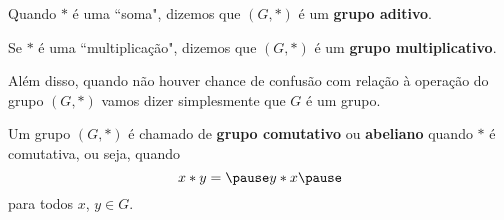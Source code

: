\documentclass{beamer}
\begin{document}
    \begin{frame}
        \begin{observacao}
            Quando $*$ é uma ``soma", \pause dizemos que $(G,*)$ é um \textbf{grupo aditivo}.\pause

            \vspace{.3cm}

            Se $*$ é uma ``multiplicação", \pause dizemos que $(G,*)$ é um \textbf{grupo multiplicativo}.\pause

            \vspace{.3cm}
            Além disso, quando não houver chance de confusão com relação à operação do grupo $(G, \ast )$ \pause vamos dizer simplesmente que $G$ é um grupo.\pause
        \end{observacao}
        \end{frame}

        \begin{frame}
        \begin{definicao}
            Um grupo $(G,*)$ \pause é chamado de \textbf{grupo comutativo} \pause ou \textbf{abeliano} \pause quando $*$ é comutativa, \pause ou seja, quando \pause
            \[
                x*y = \pause y*x \pause
            \]
            para todos $x$, $y \in G$.
        \end{definicao}
    \end{frame}
\end{document}
